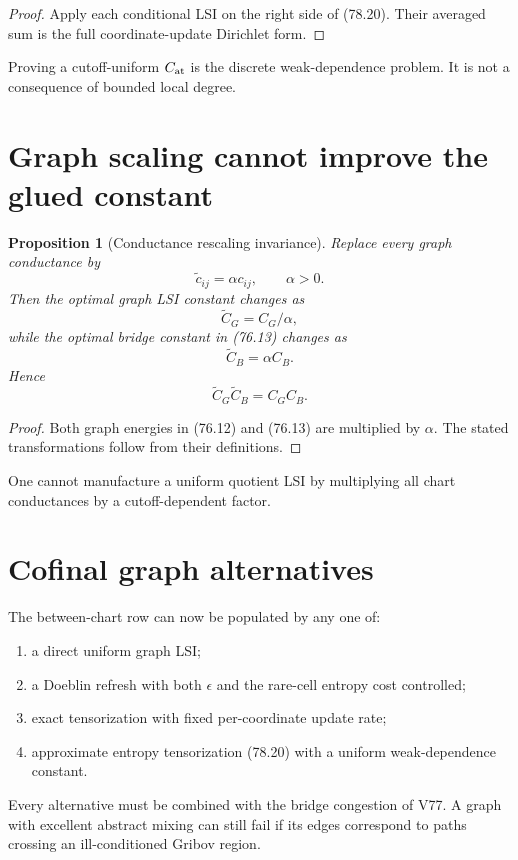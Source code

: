 \documentclass[11pt]{article}
\newtheorem{proposition}[theorem]{Proposition}
\theoremstyle{remark}
\begin{document}
\begin{proof}
Apply each conditional LSI on the right side of (78.20).  Their
averaged sum is the full coordinate-update Dirichlet form.
\end{proof}

Proving a cutoff-uniform \(C_{\rm at}\) is the discrete
weak-dependence problem.  It is not a consequence of bounded local
degree.

\section{Graph scaling cannot improve the glued constant}

\begin{proposition}[Conductance rescaling invariance]
\label{prop:v15v78-rescale}
Replace every graph conductance by
\[
 \widetilde c_{ij}=\alpha c_{ij},\qquad\alpha>0.
\]
Then the optimal graph LSI constant changes as
\[
 \widetilde C_G=C_G/\alpha,                           \tag{78.22}
\]
while the optimal bridge constant in (76.13) changes as
\[
 \widetilde C_B=\alpha C_B.                           \tag{78.23}
\]
Hence
\[
 \widetilde C_G\widetilde C_B=C_GC_B.                 \tag{78.24}
\]
\end{proposition}

\begin{proof}
Both graph energies in (76.12) and (76.13) are multiplied by
\(\alpha\).  The stated transformations follow from their
definitions.
\end{proof}

One cannot manufacture a uniform quotient LSI by multiplying all
chart conductances by a cutoff-dependent factor.

\section{Cofinal graph alternatives}

The between-chart row can now be populated by any one of:
\begin{enumerate}
\item a direct uniform graph LSI;
\item a Doeblin refresh with both \(\epsilon\) and the rare-cell
      entropy cost controlled;
\item exact tensorization with fixed per-coordinate update rate;
\item approximate entropy tensorization (78.20) with a uniform
      weak-dependence constant.
\end{enumerate}
Every alternative must be combined with the bridge congestion of
V77.  A graph with excellent abstract mixing can still fail if its
edges correspond to paths crossing an ill-conditioned Gribov
region.
\end{document}
